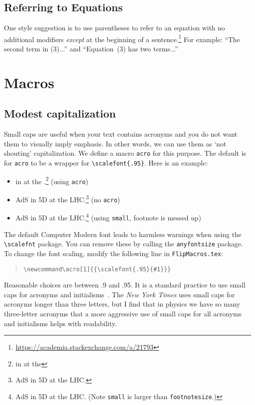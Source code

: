 \subsection{Referring to Equations}

One style suggestion is to use parentheses to refer to an equation with no additional modifiers \emph{except} at the beginning of a sentence.\footnote{\url{https://academia.stackexchange.com/a/21793}} For example: ``The second term in (3)...'' and ``Equation~(3) has two terms...''



\section{Macros}
\label{sec:macros}


\subsection{Modest capitalization}

Small caps are useful when your text contains acronyms and you do not want them to visually imply emphasis. In other words, we can use them as `not shouting' capitalization. We define a macro \texttt{acro} for this purpose. The default is for \texttt{acro} to be a wrapper for 
\verb!\scalefont{.95}!. Here is an example:
\begin{itemize}
	\item {} in  at the .\footnote{ in  at the } (using \texttt{acro})
	\item AdS in 5D at the LHC.\footnote{AdS in 5D at the LHC.} (no \texttt{acro})
	\item {\small{AdS}} in {\small{5D}} at the {\small{LHC}}.\footnote{{\small{AdS}} in {\small{5D}} at the {\small{LHC}}. (Note \texttt{small} is larger than \texttt{footnotesize}.)} (using \texttt{small}, footnote is messed up)
\end{itemize}
The default Computer Modern font leads to harmless warnings when using the \verb!\scalefnt! package. You can remove these by calling the \verb!anyfontsize! package. To change the font scaling, modify the following line in \verb!FlipMacros.tex!:
\begin{quote}
\verb!\newcommand\acro[1]{{\scalefont{.95}{#1}}}!
\end{quote}
Reasonable choices are between .9 and .95. It is a standard practice to use small caps for acronyms and initialisms~\cite{bringhurst2012elements}. The \emph{New York Times} uses small caps for acronyms longer than three letters, but I find that in physics we have so many three-letter acronyms that a more aggressive use of small caps for all acronyms and initialisms helps with readability.


